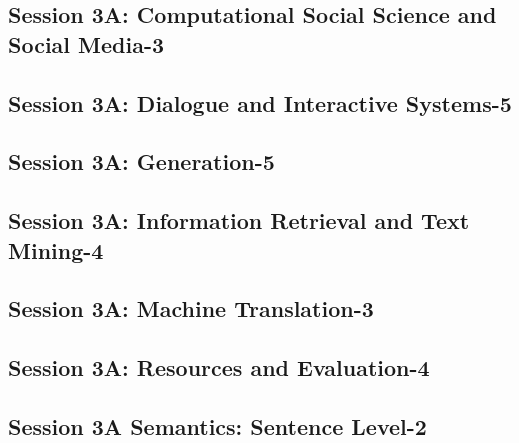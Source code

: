 \subsection{\large Session 3A: Computational Social Science and Social Media-3}
\label{parallel-session-3A-trackB}
\TrackBLoc\hfill\sessionchair{}{}
\clearpage
\subsection{\large Session 3A: Dialogue and Interactive Systems-5}
\label{parallel-session-3A-trackC}
\TrackCLoc\hfill\sessionchair{}{}
\clearpage
\subsection{\large Session 3A: Generation-5}
\label{parallel-session-3A-trackD}
\TrackDLoc\hfill\sessionchair{}{}
\clearpage
\subsection{\large Session 3A: Information Retrieval and Text Mining-4}
\label{parallel-session-3A-trackE}
\TrackELoc\hfill\sessionchair{}{}
\clearpage
\subsection{\large Session 3A: Machine Translation-3}
\label{parallel-session-3A-trackF}
\TrackFLoc\hfill\sessionchair{}{}
\clearpage
\subsection{\large Session 3A: Resources and Evaluation-4}
\label{parallel-session-3A-trackG}
\TrackGLoc\hfill\sessionchair{}{}
\clearpage
\subsection{\large Session 3A Semantics: Sentence Level-2}
\label{parallel-session-3A-trackH}
\TrackHLoc\hfill\sessionchair{}{}
\clearpage


